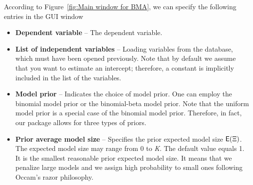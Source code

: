 According to Figure~\ref{fig:Main window for BMA}, we can specify the following
entries in the GUI  window\label{text:module_parameters}
\begin{itemize}
	\item \textbf{Dependent variable} -- The dependent variable.
	\item \textbf{List of independent variables}
		-- Loading variables from the database, which must have been
		opened previously.  Note that by
		default we assume that you want to estimate an intercept; therefore,
		a constant is implicitly included in the list of the variables.
	\item \textbf{Model prior} -- Indicates the choice of model prior. One
		can employ the binomial model prior or the binomial-beta model
		prior. Note that the uniform model prior is a special case of the
		binomial model prior. Therefore, in fact, our package allows for
		three types of priors.
	\item \textbf{Prior average model size} -- Specifies the prior
		expected model size $\mathsf{E}(\Xi)$.  The expected model size may range
		from 0 to \textit{K}. The default value equals 1.  It is the
		smallest reasonable prior expected model size. It means that we
		penalize large models and we assign high probability to small ones
		following Occam's razor philosophy.
	

\end{itemize}
